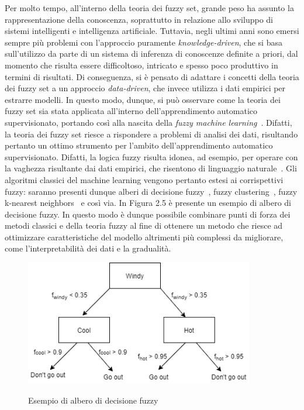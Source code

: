 \documentclass[11pt,  oneside, openany]{book}
\begin{document}
Per molto tempo, all'interno della teoria dei fuzzy set, grande peso ha assunto la rappresentazione della conoscenza, soprattutto in relazione allo sviluppo di sistemi intelligenti e intelligenza artificiale. Tuttavia, negli ultimi anni sono emersi sempre più problemi con l'approccio puramente \textit{knowledge-driven}, che si basa sull'utilizzo da parte di un sistema di inferenza di conoscenze definite a priori, dal momento che risulta essere difficoltoso, intricato e spesso poco produttivo in termini di risultati. Di conseguenza, si è pensato di adattare i concetti della teoria dei fuzzy set a un approccio \textit{data-driven}, che invece utilizza i dati empirici per estrarre modelli. In questo modo, dunque, si può osservare come la teoria dei fuzzy set sia stata applicata all'interno dell'apprendimento automatico supervisionato, portando così alla nascita della \textit{fuzzy machine learning}~\cite{fuzzyml}. Difatti, la teoria dei fuzzy set riesce a rispondere a problemi di analisi dei dati, risultando pertanto un ottimo strumento per l'ambito dell'apprendimento automatico supervisionato. Difatti, la logica fuzzy risulta idonea, ad esempio, per operare con la vaghezza risultante dai dati empirici, che risentono di linguaggio naturale~\cite{fuzzydata}. 
Gli algoritmi classici del machine learning vengono pertanto estesi ai corrispettivi fuzzy: saranno presenti dunque alberi di decisione fuzzy~\cite{fuzzydectree}, fuzzy clustering~\cite{fcm-intro}, fuzzy k-nearest neighbors~\cite{fknn-example1} e così via. In Figura 2.5 è presente un esempio di albero di decisione fuzzy. In questo modo è dunque possibile combinare punti di forza dei metodi classici e della teoria fuzzy al fine di ottenere un metodo che riesce ad ottimizzare caratteristiche del modello altrimenti più complessi da migliorare, come l'interpretabilità dei dati e la gradualità. 

\begin{figure}[h!]
\begin{center}
  \includegraphics[width=10cm]{Immagini/fuzzyTreeDecis.png}\\
  \caption{Esempio di albero di decisione fuzzy}
\end{center}
\end{figure}
\end{document}
